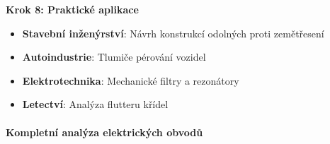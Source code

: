 \begin{example}
\vspace{1\baselineskip}

\noindent\textbf{Krok 8: Praktické aplikace}
\begin{itemize}
\item \textbf{Stavební inženýrství}: Návrh konstrukcí odolných proti zemětřesení
\item \textbf{Autoindustrie}: Tlumiče pérování vozidel
\item \textbf{Elektrotechnika}: Mechanické filtry a rezonátory
\item \textbf{Letectví}: Analýza flutteru křídel
\end{itemize}

\end{example}

\paragraph{Kompletní analýza elektrických obvodů}

